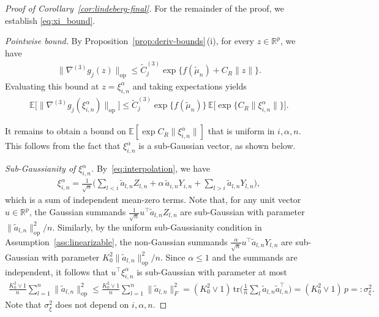 \documentclass[12pt]{article}
\newcommand{\op}{\mathrm{op}}
\newcommand{\real}{\mathbb{R}}
\newcommand{\Ee}{{\mathbb{E}}}
\begin{document}
\begin{appendices}
\begin{proof}[Proof of Corollary~\ref{cor:lindeberg-final}]
For the remainder of the proof, we establish \eqref{eq:xi_bound}.

\medskip\noindent\textit{Pointwise bound.}
By Proposition~\ref{prop:deriv-bounds}\,(i), for every $z\in\real^p$, we have
\begin{align*}
  \|\nabla^{(3)}g_j(z)\|_{\op}
  \le\widetilde C_j^{(3)}\exp\{f(\widetilde\mu_n)+C_R\|z\|\}.
\end{align*}
Evaluating this bound at $z=\xi^\alpha_{i,n}$ and taking expectations yields
\begin{align}
  \label{eq:xi_exp_bound}
  \Ee\big[\|\nabla^{(3)}g_j(\xi^\alpha_{i,n})\|_{\op}\big]
  \le\widetilde C_j^{(3)}\exp\{f(\widetilde\mu_n)\}\,
     \Ee\big[\exp\{C_R\|\xi^\alpha_{i,n}\|\}\big].
\end{align}

It remains to obtain a bound on $\Ee[\exp{C_R\|\xi^\alpha_{i,n}\|}]$ that is uniform in $i,\alpha,n$.
This follows from the fact that $\xi^\alpha_{i,n}$ is a sub-Gaussian vector, as shown below.

\medskip\noindent\textit{Sub-Gaussianity of $\xi^\alpha_{i,n}$.}
By~\eqref{eq:interpolation}, we have
\begin{align*}
  \xi^\alpha_{i,n}
  =\frac{1}{\sqrt n}\Big(
     \sum_{l<i}\widetilde a_{l,n}Z_{l,n}
     +\alpha\,\widetilde a_{i,n}Y_{i,n}
     +\sum_{l>i}\widetilde a_{l,n}Y_{l,n}\Big),
\end{align*}
which is a sum of independent mean-zero terms. 
Note that, for any unit  vector $u\in\real^p$, the Gaussian summands $\tfrac{1}{\sqrt n}u^\top\widetilde a_{l,n}Z_{l,n}$ are sub-Gaussian with parameter  $\|\widetilde a_{l,n}\|_{\op}^2/n$. 
Similarly, by the uniform sub-Gaussianity condition in Assumption~\ref{ass:linearizable}, the non-Gaussian summands $\tfrac{\alpha}{\sqrt n}u^\top\widetilde a_{l,n}Y_{l,n}$ are sub-Gaussian with parameter $K_0^2\|\widetilde a_{l,n}\|_{\op}^2/n$. 
Since $\alpha\le1$ and the summands are independent, it follows that $u^\top\xi^\alpha_{i,n}$ is sub-Gaussian with parameter at most
\begin{align*}
  \frac{K_0^2\vee1}{n}\sum_{l=1}^n\|\widetilde a_{l,n}\|_{\op}^2
  \le\frac{K_0^2\vee1}{n}\sum_{l=1}^n\|\widetilde a_{l,n}\|_F^2
  =(K_0^2\vee1)\,\mathrm{tr}\Big(\tfrac1n\sum_l
     \widetilde a_{l,n}\widetilde a_{l,n}^\top\Big)
  =(K_0^2\vee1)\,p
  =:\sigma_\xi^2.
\end{align*}
Note that $\sigma_\xi^2$ does not depend on $i,\alpha,n$. 




\end{proof}
\end{appendices}
\end{document}
